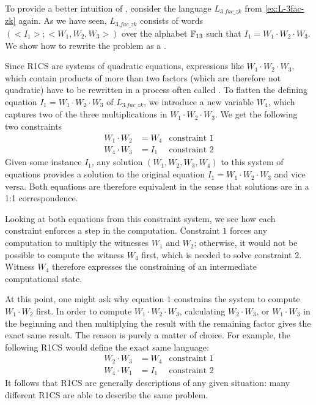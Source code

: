 \begin{example}\label{ex:3-factorization-r1cs} To provide a better intuition of , consider the language $L_{3.fac\_zk}$ from \examplename{} \ref{ex:L-3fac-zk} again. As we have seen, $L_{3.fac\_zk}$ consists of words $(<I_1>;<W_1,W_2,W_3>)$ over the alphabet $\mathbb{F}_{13}$ such that $I_1 = W_1\cdot W_2\cdot W_3$. We show how to rewrite the problem as a .

Since R1CS are systems of quadratic equations, expressions like $W_1\cdot W_2\cdot W_3$, which contain products of more than two factors (which are therefore not quadratic) have to be rewritten in a process often called . To flatten the defining equation $I_1 = W_1\cdot W_2\cdot W_3$ of $L_{3.fac\_zk}$, we introduce a new variable $W_4$, which captures two of the three multiplications in $W_1\cdot W_2\cdot W_3$. We get the following two constraints
\begin{align*}
W_1 \cdot W_2 & = W_4 & \text{constraint } 1 \\
W_4 \cdot W_3 & = I_1 & \text{constraint } 2
\end{align*}
Given some instance $I_1$, any solution $(W_1,W_2,W_3,W_4)$ to this system of equations provides a solution to the original equation $I_1 = W_1\cdot W_2\cdot W_3$ and vice versa. Both equations are therefore equivalent in the sense that solutions are in a 1:1 correspondence.

Looking at both equations from this constraint system, we see how each constraint enforces a step in the computation. Constraint $1$ forces any computation to multiply the witnesses $W_1$ and $W_2$; otherwise, it would not be possible to compute the witness $W_4$ first, which is needed to solve constraint $2$. Witness $W_4$ therefore expresses the constraining of an intermediate computational state.

At this point, one might ask why equation $1$ constrains the system to compute $W_1\cdot W_2$ first. In order to compute $W_1\cdot W_2 \cdot W_3$, calculating $W_2\cdot W_3$, or $W_1\cdot W_3$ in the beginning and then multiplying the result with the remaining factor gives the exact same result.  The reason is purely a matter of choice. For example, the following R1CS would define the exact same language:
\begin{align*}
W_2 \cdot W_3 & = W_4 & \text{constraint } 1 \\
W_4 \cdot W_1 & = I_1 & \text{constraint } 2 
\end{align*}
It follows that R1CS are generally  descriptions of any given situation: many different R1CS are able to describe the same problem.


\end{example}
